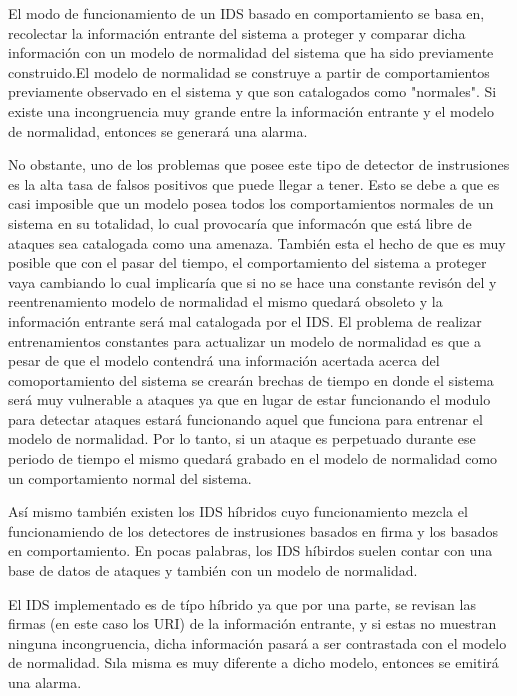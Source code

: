 \documentclass{article}
\begin{document}
El modo de funcionamiento de un IDS basado en comportamiento se basa en, recolectar la informaci\'on entrante del sistema a proteger y comparar dicha informaci\'on con un modelo de normalidad del sistema que ha sido previamente construido.El modelo de normalidad se construye a partir de comportamientos previamente observado en el sistema y que son catalogados como "normales". Si existe una incongruencia muy grande entre la informaci\'on entrante y el modelo de normalidad, entonces se generar\'a una alarma. 

No obstante, uno de los problemas que posee este tipo de detector de instrusiones es la alta tasa de falsos positivos que puede llegar a tener. Esto se debe a que es casi imposible que un modelo posea todos los comportamientos normales de un sistema en su totalidad, lo cual provocar\'ia que informac\'on que est\'a libre de ataques sea catalogada como una amenaza. Tambi\'en esta el hecho de que es muy posible que con el pasar del tiempo, el comportamiento del sistema a proteger vaya cambiando lo cual implicar\'ia que si no se hace una constante revis\'on del y reentrenamiento modelo de normalidad el mismo quedar\'a obsoleto y la informaci\'on entrante ser\'a mal catalogada por el IDS. El problema de realizar entrenamientos constantes para actualizar un modelo de normalidad es que a pesar de que el modelo contendr\'a una informaci\'on acertada acerca del comoportamiento del sistema se crear\'an brechas de tiempo en donde el sistema ser\'a muy vulnerable a ataques ya que en lugar de estar funcionando el modulo para detectar ataques estar\'a funcionando aquel que funciona para entrenar el modelo de normalidad. Por lo tanto, si un ataque es perpetuado durante ese periodo de tiempo el mismo quedar\'a grabado en el modelo de normalidad como un comportamiento normal del sistema.

As\'i mismo tambi\'en existen los IDS h\'ibridos cuyo funcionamiento mezcla el funcionamiendo de los detectores de instrusiones basados en firma y los basados en comportamiento. En pocas palabras, los IDS h\'ibirdos suelen contar con una base de datos de ataques y tambi\'en con un modelo de normalidad.

El IDS implementado es de t\'ipo h\'ibrido ya que por una parte, se revisan las firmas (en este caso los URI) de la informaci\'on entrante, y si estas no muestran ninguna incongruencia, dicha informaci\'on pasar\'a a ser contrastada con el modelo de normalidad. S\i la misma es muy diferente a dicho modelo, entonces se emitir\'a una alarma.
\end{document}
